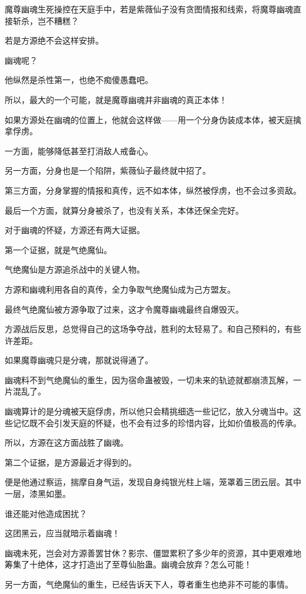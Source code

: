\begin{this_body}
魔尊幽魂生死操控在天庭手中，若是紫薇仙子没有贪图情报和线索，将魔尊幽魂直接斩杀，岂不糟糕？

若是方源绝不会这样安排。

幽魂呢？

他纵然是杀性第一，也绝不痴傻愚蠢吧。

所以，最大的一个可能，就是魔尊幽魂并非幽魂的真正本体！

如果方源处在幽魂的位置上，他就会这样做——用一个分身伪装成本体，被天庭擒拿俘虏。

一方面，能够降低甚至打消敌人戒备心。

另一方面，分身也是一个陷阱，紫薇仙子最终就中招了。

第三方面，分身掌握的情报和真传，远不如本体，纵然被俘虏，也不会过多资敌。

最后一个方面，就算分身被杀了，也没有关系，本体还保全完好。

对于幽魂的怀疑，方源还有两大证据。

第一个证据，就是气绝魔仙。

气绝魔仙是方源追杀战中的关键人物。

方源和幽魂利用各自的真传，全力争取气绝魔仙成为己方盟友。

最终气绝魔仙被方源争取了过来，这才令魔尊幽魂最终自爆毁灭。

方源战后反思，总觉得自己的这场争夺战，胜利的太轻易了。和自己预料的，有些许差距。

如果魔尊幽魂只是分魂，那就说得通了。

幽魂料不到气绝魔仙的重生，因为宿命蛊被毁，一切未来的轨迹就都崩溃瓦解，一片混乱了。

幽魂算计的是分魂被天庭俘虏，所以他只会精挑细选一些记忆，放入分魂当中。这些记忆既不会引发天庭的怀疑，也不会有过多的珍惜内容，比如价值极高的传承。

所以，方源在这方面战胜了幽魂。

第二个证据，是方源最近才得到的。

便是他通过察运，揣摩自身气运，发现自身纯银光柱上端，笼罩着三团云层。其中一层，漆黑如墨。

谁还能对他造成困扰？

这团黑云，应当就暗示着幽魂！

幽魂未死，岂会对方源善罢甘休？影宗、僵盟累积了多少年的资源，其中更艰难地筹集了十绝体，这才打造出了至尊仙胎蛊。幽魂会放弃？怎么可能！

另一方面，气绝魔仙的重生，已经告诉天下人，尊者重生也绝非不可能的事情。


\end{this_body}
